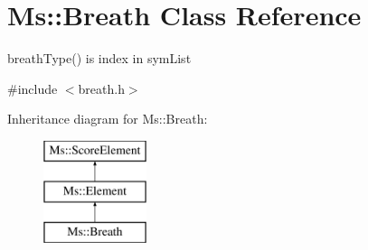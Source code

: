 \hypertarget{class_ms_1_1_breath}{}\section{Ms\+:\+:Breath Class Reference}
\label{class_ms_1_1_breath}


breath\+Type() is index in sym\+List  




{\ttfamily \#include $<$breath.\+h$>$}

Inheritance diagram for Ms\+:\+:Breath\+:\begin{figure}[H]
\begin{center}
\leavevmode
\includegraphics[height=3.000000cm]{class_ms_1_1_breath}
\end{center}
\end{figure}
